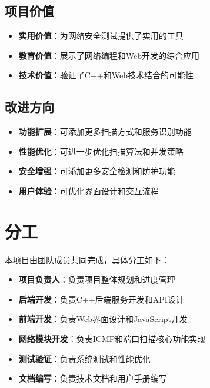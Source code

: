 \documentclass[12pt,hyperref,a4paper,UTF8]{ctexart}
\begin{document}
\subsection{项目价值}
\begin{itemize}
    \item \textbf{实用价值}：为网络安全测试提供了实用的工具
    \item \textbf{教育价值}：展示了网络编程和Web开发的综合应用
    \item \textbf{技术价值}：验证了C++和Web技术结合的可能性
\end{itemize}

\subsection{改进方向}
\begin{itemize}
    \item \textbf{功能扩展}：可添加更多扫描方式和服务识别功能
    \item \textbf{性能优化}：可进一步优化扫描算法和并发策略
    \item \textbf{安全增强}：可添加更多安全检测和防护功能
    \item \textbf{用户体验}：可优化界面设计和交互流程
\end{itemize}

\section{分工}

本项目由团队成员共同完成，具体分工如下：

\begin{itemize}
    \item \textbf{项目负责人}：负责项目整体规划和进度管理
    \item \textbf{后端开发}：负责C++后端服务开发和API设计
    \item \textbf{前端开发}：负责Web界面设计和JavaScript开发
    \item \textbf{网络模块开发}：负责ICMP和端口扫描核心功能实现
    \item \textbf{测试验证}：负责系统测试和性能优化
    \item \textbf{文档编写}：负责技术文档和用户手册编写
\end{itemize}


\end{document}
